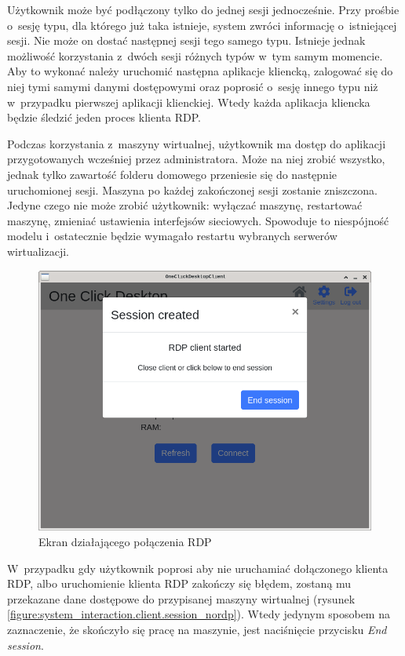 \documentclass[../opis-rozwiazania.tex]{subfiles}
\begin{document}
Użytkownik może być podłączony tylko do jednej sesji jednocześnie.
Przy prośbie o~sesję typu, dla którego już taka istnieje, system zwróci informację o~istniejącej sesji.
Nie może on dostać następnej sesji tego samego typu.
Istnieje jednak możliwość korzystania z~dwóch sesji różnych typów w~tym samym momencie.
Aby to wykonać należy uruchomić następna aplikacje kliencką, zalogować się do niej tymi samymi danymi dostępowymi oraz poprosić o~sesję innego typu niż w~przypadku pierwszej aplikacji klienckiej.
Wtedy każda aplikacja kliencka będzie śledzić jeden proces klienta RDP.

Podczas korzystania z~maszyny wirtualnej, użytkownik ma dostęp do aplikacji przygotowanych wcześniej przez administratora.
Może na niej zrobić wszystko, jednak tylko zawartość folderu domowego przeniesie się do następnie uruchomionej sesji.
Maszyna po każdej zakończonej sesji zostanie zniszczona.
Jedyne czego nie może zrobić użytkownik: wyłączać maszynę, restartować maszynę, zmieniać ustawienia interfejsów sieciowych.
Spowoduje to niespójność modelu i~ostatecznie będzie wymagało restartu wybranych serwerów wirtualizacji. 

\begin{figure}[ht!]
  \centering
  \includegraphics[width=\textwidth]{resources/client_session.png}
  \caption{Ekran działającego połączenia RDP}
  \label{figure:system_interaction.client.session}
\end{figure}

W~przypadku gdy użytkownik poprosi aby nie uruchamiać dołączonego klienta RDP, albo uruchomienie klienta RDP zakończy się błędem, zostaną mu przekazane dane dostępowe do przypisanej maszyny wirtualnej (rysunek \ref{figure:system_interaction.client.session_nordp}).
Wtedy jedynym sposobem na zaznaczenie, że skończyło się pracę na maszynie, jest naciśnięcie przycisku \textit{End session}.
\end{document}
